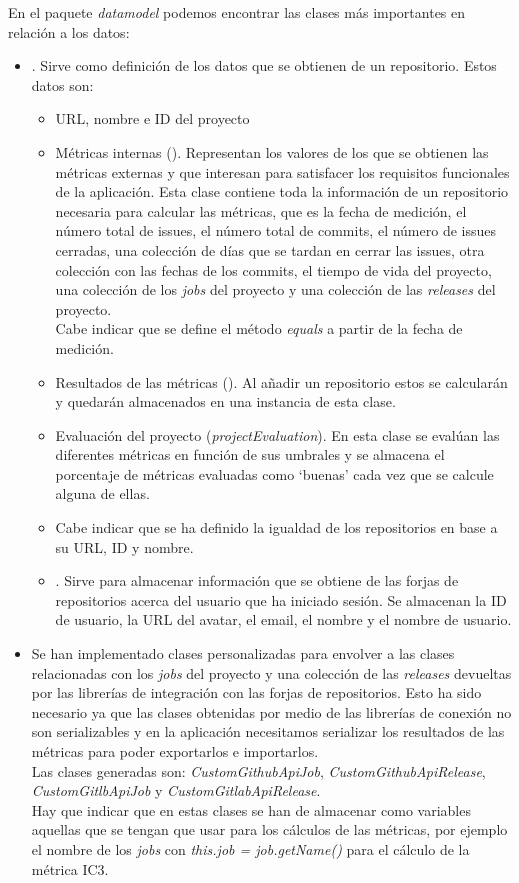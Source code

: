 En el paquete \textit{datamodel} podemos encontrar las clases más importantes en relación a los datos:
\begin{itemize}
	\item {}. Sirve como definición de los datos que se obtienen de un repositorio. Estos datos son:
	\begin{itemize}
		\item URL, nombre e ID del proyecto
		\item Métricas internas (). Representan los valores de los que se obtienen las métricas externas y que interesan para satisfacer los requisitos funcionales de la aplicación. Esta clase contiene toda la información de un repositorio necesaria para calcular las métricas, que es la fecha de medición, el número total de issues, el número total de commits, el número de issues cerradas, una colección de días que se tardan en cerrar las issues, otra colección con las fechas de los commits, el tiempo de vida del proyecto, una colección de los \textit{jobs} del proyecto y una colección de las \textit{releases} del proyecto.\\
		Cabe indicar que se define el método \textit{equals} a partir de la fecha de medición.
		\item Resultados de las métricas (). Al añadir un repositorio estos se calcularán y quedarán almacenados en una instancia de esta clase.
		\item Evaluación del proyecto (\textit{projectEvaluation}). En esta clase se evalúan las diferentes métricas en función de sus umbrales y se almacena el porcentaje de métricas evaluadas como `buenas' cada vez que se calcule alguna de ellas.
		\item Cabe indicar que se ha definido la igualdad de los repositorios en base a su URL, ID y nombre.
	\item {}. Sirve para almacenar información que se obtiene de las forjas de repositorios acerca del usuario que ha iniciado sesión. Se almacenan la ID de usuario, la URL del avatar, el email, el nombre y el nombre de usuario.
	\end{itemize}
	\item Se han implementado clases personalizadas para envolver a las clases relacionadas con los \textit{jobs} del proyecto y una colección de las \textit{releases} devueltas por las librerías de integración con las forjas de repositorios. Esto ha sido necesario ya que las clases obtenidas por medio de las librerías de conexión no son serializables y en la aplicación necesitamos serializar los resultados de las métricas para poder exportarlos e importarlos.\\
	Las clases generadas son: \textit{CustomGithubApiJob}, \textit{CustomGithubApiRelease}, \textit{CustomGitlbApiJob} y \textit{CustomGitlabApiRelease}.\\
	Hay que indicar que en estas clases se han de almacenar como variables aquellas que se tengan que usar para los cálculos de las métricas, por ejemplo el nombre de los \textit{jobs} con \textit{this.job = job.getName()} para el cálculo de la métrica IC3.
\end{itemize}


